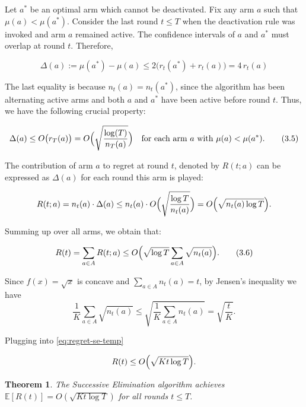\documentclass[12pt]{article}
\newtheorem{theorem}{Theorem}[section]
\begin{document}
\noindent Let $a^*$ be an optimal arm which cannot be deactivated. Fix any arm $a$ such that $\mu(a) < \mu(a^*)$. Consider the last round $t \le T$ when the deactivation rule was invoked and arm $a$ remained active. The confidence intervals of $a$ and $a^*$ must overlap at round $t$. Therefore,

\[
\Delta(a) := \mu(a^*) - \mu(a) \le 2 \bigl( r_t(a^*) + r_t(a) \bigr) = 4 \, r_t(a)
\]

\noindent The last equality is because $n_t(a) = n_t(a^*)$, since the algorithm has been alternating active arms and both $a$ and $a^*$ have been active before round $t$. Thus, we have the following crucial property:

\begin{equation}
\Delta(a) \le O\bigl(r_T(a)\bigr) = O\Bigl(\sqrt{\frac{\log(T)}{n_T(a)}}\Bigr)
\quad \text{for each arm } a \text{ with } \mu(a) < \mu(a^*).
\tag{3.5}
\end{equation}

The contribution of arm $a$ to regret at round $t$, denoted by $R(t; a)$ can be expressed as $\Delta(a)$ for each round this arm is played:

\[
R(t; a) = n_t(a) \cdot \Delta(a) \le n_t(a) \cdot O\Bigl(\sqrt{\frac{\log T}{n_t(a)}}\Bigr) 
= O\Bigl(\sqrt{n_t(a) \log T}\Bigr).
\]


\noindent Summing up over all arms, we obtain that:

\begin{equation}
R(t) = \sum_{a \in A} R(t; a) \le O\Bigl(\sqrt{\log T} \sum_{a \in A} \sqrt{n_t(a)} \Bigr). \tag{3.6}
\label{eq:regret-se-temp}
\end{equation}



\noindent
Since $f(x) = \sqrt{x}$ is concave and $\sum_{a \in A} n_t(a) = t$, by Jensen's inequality we have
\[
\frac{1}{K} \sum_{a \in A} \sqrt{n_t(a)} \le \sqrt{\frac{1}{K} \sum_{a \in A} n_t(a)} = \sqrt{\frac{t}{K}}.
\]

\noindent Plugging into \ref{eq:regret-se-temp}

\[
R(t) \le O\Bigl(\sqrt{K t \log T}\Bigr).
\]

\begin{theorem}
The Successive Elimination algorithm achieves $\mathbb{E}[R(t)] = O(\sqrt{K t \log T})$ for all rounds $t \le T$.
\end{theorem}

\vspace{5mm}
\end{document}
